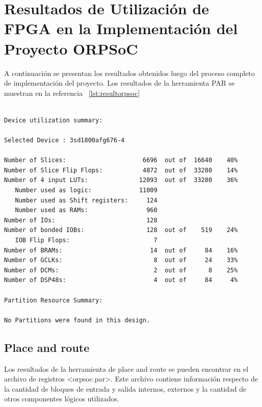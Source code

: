 		
\newpage
	\section{Resultados de Utilización de FPGA en la Implementación del Proyecto ORPSoC}
	
	A continuación se presentan los resultados obtenidos luego del proceso completo de implementación del proyecto.  Los resultados de la herramienta PAR
	se muestran en la referencia ~\ref{lst:resultorpsoc}
		
\begin{lstlisting}[frame=single,caption={Resumen de utilización - ORPSoC},label={lst:resultorpsoc},breaklines]

Device utilization summary:

Selected Device : 3sd1800afg676-4 

Number of Slices:                     6696  out of  16640    40%  
Number of Slice Flip Flops:           4872  out of  33280    14%  
Number of 4 input LUTs:              12093  out of  33280    36%  
   Number used as logic:             11009
   Number used as Shift registers:     124
   Number used as RAMs:                960
Number of IOs:                         128
Number of bonded IOBs:                 128  out of    519    24%  
   IOB Flip Flops:                       7
Number of BRAMs:                        14  out of     84    16%  
Number of GCLKs:                         8  out of     24    33%  
Number of DCMs:                          2  out of      8    25%  
Number of DSP48s:                        4  out of     84     4%  

Partition Resource Summary:

No Partitions were found in this design.
\end{lstlisting}	
		
		\subsection{Place and route}	
		
		Los resultados de la herramienta de place and route se pueden encontrar en el archivo de registros <orpsoc.par>. Este archivo contiene información
		respecto de la cantidad de bloques de entrada y salida internos, externos y la cantidad de otros componentes lógicos utilizados. 
		
